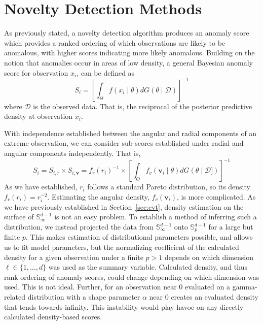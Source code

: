 \section{Novelty Detection Methods\label{sec:novelty}}
As previously stated, a novelty detection algorithm produces an anomaly score 
    which provides a ranked ordering of which observations are likely to be 
    anomalous, with higher scores indicating more likely anomalous. Building on 
    the notion that anomalies occur in areas of low density, a general Bayesian
    anomaly score for observation $x_i$, can be defined as
    \[
    S_i = \left[\int_{\Theta}f(x_i\mid\theta)dG(\theta\mid\mathcal{D})\right]^{-1}
    \]
    where $\mathcal{D}$ is the observed data.  That is, the reciprocal of the 
    posterior predictive density at observation $x_i$.

With independence established between the angular and radial components of an
    extreme observation, we can consider sub-scores established under radial 
    and angular components independently.  That is,
    \[
        S_i = S_{i,r}\times S_{i,\bm{v}} = 
            f_r(r_i)^{-1}\times
            \left[\int_{\Theta}f_v(\bm{v}_i\mid\theta)
                dG(\theta\mid\mathcal{D}])\right]^{-1}
    \]
    As we have established, $r_i$ follows a standard Pareto distribution, so its
    density $f_r(r_i) = r_i^{-2}$.  Estimating the angular density, 
    $f_v(\bm{v}_i)$, is more complicated.  As we have previously established in
    Section~\ref{sec:evt}, density estimation on the surface of 
    ${\mathbb S}_{\infty}^{d-1}$ is not an easy problem. To establish a method
    of inferring such a distribution, we instead projected the data from 
    $\mathbb{S}_{\infty}^{d-1}$ onto $\mathbb{S}_p^{d-1}$ for a large but finite
    $p$.  This makes estimation of distributional parameters possible, and allows
    us to fit model parameters, but the normalizing coefficient of the
    calculated density for a given observation under a finite $p > 1$ depends on
    which dimension $\ell \in \lbrace 1,\ldots,d\rbrace$ was used as the summary
    variable.  Calculated density, and thus rank ordering of anomaly scores,
    could change depending on which dimension was used.  This is not ideal.
    Further, for an observation near 0 evaluated on a gamma-related distribution 
    with a shape parameter $\alpha$ near 0 creates an evaluated density that 
    tends towards infinity.  This instability would play havoc on any directly 
    calculated density-based scores.

